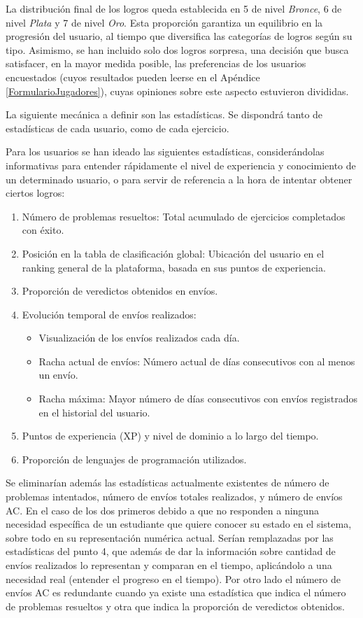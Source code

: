 La distribución final de los logros queda establecida en 5 de nivel \textit{Bronce}, 6 de nivel \textit{Plata} y 7 de nivel \textit{Oro}. Esta proporción garantiza un equilibrio en la progresión del usuario, al tiempo que diversifica las categorías de logros según su tipo. Asimismo, se han incluido solo dos logros sorpresa, una decisión que busca satisfacer, en la mayor medida posible, las preferencias de los usuarios encuestados (cuyos resultados pueden leerse en el Apéndice \ref{FormularioJugadores}), cuyas opiniones sobre este aspecto estuvieron divididas.

La siguiente mecánica a definir son las estadísticas. Se dispondrá tanto de estadísticas de cada usuario, como de cada ejercicio. 

Para los usuarios se han ideado las siguientes estadísticas, considerándolas informativas para entender rápidamente el nivel de experiencia y conocimiento de un determinado usuario, o para servir de referencia a la hora de intentar obtener ciertos logros:

\begin{enumerate}
    \item Número de problemas resueltos: Total acumulado de ejercicios completados con éxito.
    \item Posición en la tabla de clasificación global: Ubicación del usuario en el ranking general de la plataforma, basada en sus puntos de experiencia.
    \item Proporción de veredictos obtenidos en envíos.
    \item Evolución temporal de envíos realizados: 
    \begin{itemize}
        \item Visualización de los envíos realizados cada día.
        \item Racha actual de envíos: Número actual de días consecutivos con al menos un envío.
        \item Racha máxima: Mayor número de días consecutivos con envíos registrados en el historial del usuario.
    \end{itemize}
    \item Puntos de experiencia (XP) y nivel de dominio a lo largo del tiempo.
    \item Proporción de lenguajes de programación utilizados.
\end{enumerate}
Se eliminarían además las estadísticas actualmente existentes de número de problemas intentados, número de envíos totales realizados, y número de envíos AC. En el caso de los dos primeros debido a que no responden a ninguna necesidad específica de un estudiante que quiere conocer su estado en el sistema, sobre todo en su representación numérica actual. Serían remplazadas por las estadísticas del punto 4, que además de dar la información sobre cantidad de envíos realizados lo representan y comparan en el tiempo, aplicándolo a una necesidad real (entender el progreso en el tiempo). Por otro lado el número de envíos AC es redundante cuando ya existe una estadística que indica el número de problemas resueltos y otra que indica la proporción de veredictos obtenidos.

